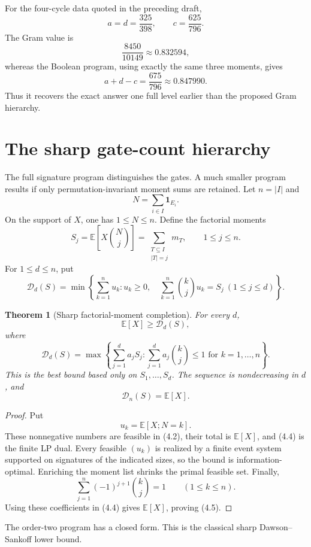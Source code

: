 \documentclass[11pt]{article}
\newtheorem{theorem}{Theorem}[section]
\theoremstyle{definition}
\theoremstyle{remark}
\newcommand{\E}{\mathbb E}
\newcommand{\one}{\mathbf 1}
\newcommand{\cD}{\mathcal D}
\begin{document}
For the four-cycle data quoted in the preceding draft,
\[
 a=d=\frac{325}{398},\qquad c=\frac{625}{796}.
\]
The Gram value is
\[
 \frac{8450}{10149}\approx0.832594,
\]
whereas the Boolean program, using exactly the same three moments, gives
\[
 a+d-c=\frac{675}{796}\approx0.847990.
\]
Thus it recovers the exact answer one full level earlier than the proposed
Gram hierarchy.

\section{The sharp gate-count hierarchy}

The full signature program distinguishes the gates.  A much smaller
program results if only permutation-invariant moment sums are retained.
Let $n=|I|$ and
\[
 N=\sum_{i\in I}\one_{E_i}.
\]
On the support of $X$, one has $1\leq N\leq n$.  Define the factorial
moments
\[
 S_j=\E\left[X\binom Nj\right]
 =\sum_{\substack{T\subseteq I\\|T|=j}}m_T,
 \qquad 1\leq j\leq n.
 \tag{4.1}
\]
For $1\leq d\leq n$, put
\[
 \cD_d(S)=
 \min\left\{
  \sum_{k=1}^n u_k:
  u_k\geq0,\quad
  \sum_{k=1}^n\binom kj u_k=S_j\ (1\leq j\leq d)
 \right\}.
 \tag{4.2}
\]

\begin{theorem}[Sharp factorial-moment completion]\label{thm:count}
For every $d$,
\[
 \boxed{\E[X]\geq\cD_d(S),}
 \tag{4.3}
\]
where
\[
 \boxed{
 \cD_d(S)=
 \max\left\{
  \sum_{j=1}^d a_jS_j:
  \sum_{j=1}^d a_j\binom kj\leq1
  \text{ for }k=1,\ldots,n
 \right\}.}
 \tag{4.4}
\]
This is the best bound based only on $S_1,\ldots,S_d$.  The sequence is
nondecreasing in $d$, and
\[
 \boxed{\cD_n(S)=\E[X].}
 \tag{4.5}
\]
\end{theorem}

\begin{proof}
Put
\[
 u_k=\E[X;N=k].
\]
These nonnegative numbers are feasible in (4.2), their total is $\E[X]$,
and (4.4) is the finite LP dual.  Every feasible $(u_k)$ is realized by a
finite event system supported on signatures of the indicated sizes, so the
bound is information-optimal.  Enriching the moment list shrinks the
primal feasible set.  Finally,
\[
 \sum_{j=1}^n(-1)^{j+1}\binom kj=1
 \qquad(1\leq k\leq n).
\]
Using these coefficients in (4.4) gives $\E[X]$, proving (4.5).
\end{proof}

The order-two program has a closed form.  This is the classical sharp
Dawson--Sankoff lower bound.
\end{document}
